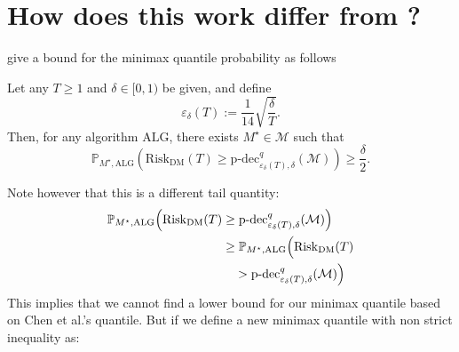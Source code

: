 \documentclass[conference]{IEEEtran}
\newtheorem{theorem}{Theorem}
\begin{document}

\iffalse
\section{How does this work differ from \cite{chen2024assouad}?}



\cite{chen2024assouad} give a bound for the minimax quantile probability as follows

Let any $T \geq 1$ and $\delta \in [0,1)$ be given, and define
\[
\varepsilon_{\delta}(T) := \frac{1}{14}\sqrt{\frac{\delta}{T}}.
\]
Then, for any algorithm $\mathrm{ALG}$, there exists $M^\star \in \mathcal{M}$ such that
\[
\mathbb{P}_{M^\star,\mathrm{ALG}}\left(\mathrm{Risk}_{\mathrm{DM}}(T)\geq \text{p-dec}_{\varepsilon_{\delta}(T),\delta}^{q}(\mathcal{M})\right)\geq \frac{\delta}{2}.
\]

Note however that this is a different tail quantity:
\begin{align*}
\mathbb{P}_{M^\star,\mathrm{ALG}} \Bigl( \mathrm{Risk}_{\mathrm{DM}}(T) 
&\geq \text{p-dec}_{\varepsilon_{\delta}(T),\delta}^{q}(\mathcal{M}) \Bigr) \\
&\geq 
\mathbb{P}_{M^\star,\mathrm{ALG}} \Bigl( \mathrm{Risk}_{\mathrm{DM}}(T) \\
&\quad > \text{p-dec}_{\varepsilon_{\delta}(T),\delta}^{q}(\mathcal{M}) \Bigr)
\end{align*}
This implies that we cannot find a lower bound for our minimax quantile based on Chen et al.'s quantile. But if we define a new minimax quantile with non strict inequality as:
\end{document}

